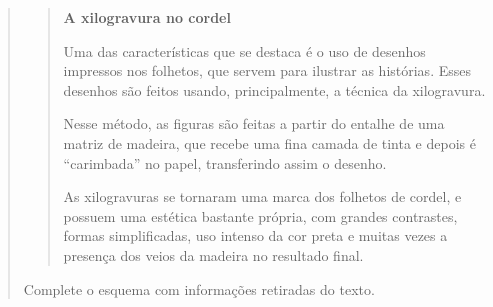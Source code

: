 \begin{quote}
\begin{quote}
\textbf{A xilogravura no cordel}

Uma das características que se destaca é o uso de desenhos impressos nos
folhetos, que servem para ilustrar as histórias. Esses desenhos são
feitos usando, principalmente, a técnica da xilogravura.

Nesse método, as figuras são feitas a partir do entalhe de uma matriz de
madeira, que recebe uma fina camada de tinta e depois é ``carimbada'' no
papel, transferindo assim o desenho.

As xilogravuras se tornaram uma marca dos folhetos de cordel, e possuem
uma estética bastante própria, com grandes contrastes, formas
simplificadas, uso intenso da cor preta e muitas vezes a presença dos
veios da madeira no resultado final.

\end{quote}


Complete o esquema com informações retiradas do texto.


\end{quote}
